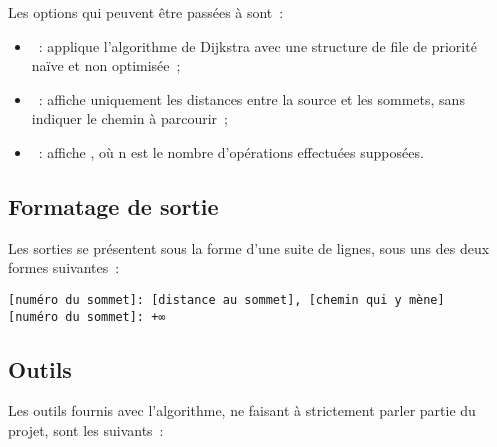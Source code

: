 \documentclass[12p0t,a4paper]{article}
\begin{document}
Les options qui peuvent être passées à  sont~:
\begin{itemize}
\item {}~: applique l'algorithme de Dijkstra avec une structure de file de priorité naïve et non optimisée~;
\item {}~: affiche uniquement les distances entre la source et les sommets, sans indiquer le chemin à parcourir~;
\item {}~: affiche , où n est le nombre d'opérations effectuées supposées.
\end{itemize}

\subsection{Formatage de sortie}

Les sorties se présentent sous la forme d'une suite de lignes, sous uns des deux formes suivantes~:
\begin{lstlisting}
[numéro du sommet]: [distance au sommet], [chemin qui y mène]
[numéro du sommet]: +∞
\end{lstlisting}

\subsection{Outils}

Les outils fournis avec l'algorithme, ne faisant à strictement parler partie du projet, sont les suivants~:
\end{document}
